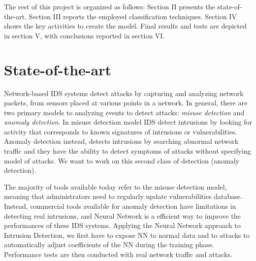\documentclass[twocolumn,11pt]{asme2ej}
\begin{document}
The rest of this project is organized as follows: Section II presents the state-of-the-art. Section III reports the employed classification techniques. Section IV shows the  key activities to create the model. Final results and tests are depicted in section V, with conclusions reported in section VI.


\section{State-of-the-art}


Network-based IDS systems detect attacks by capturing and analyzing network packets, from
sensors placed at various points in a network. In general, there are two primary models to analyzing events to detect attacks: \textit{misuse detection} and \textit{anomaly detection}. In misuse detection model IDS detect intrusions by looking for activity that corresponds to known signatures of intrusions or vulnerabilities. Anomaly detection instead, detects intrusions by searching abnormal network traffic and they have the ability to detect symptoms of attacks without specifying model of attacks. We want to work on this second class of detection (anomaly detection).

The majority of tools available today refer to the misuse detection model, meaning that administrators need to regularly update vulnerabilities database. Instead, commercial tools available for anomaly detection have limitations in detecting real intrusions, and Neural Network is a efficient way to improve the performances of these IDS systems. Applying the Neural Network approach to Intrusion Detection, we first have to expose NN to normal data and to attacks to automatically adjust coefficients of the NN during the training phase. Performance tests are then conducted with real network traffic and attacks.
\end{document}
